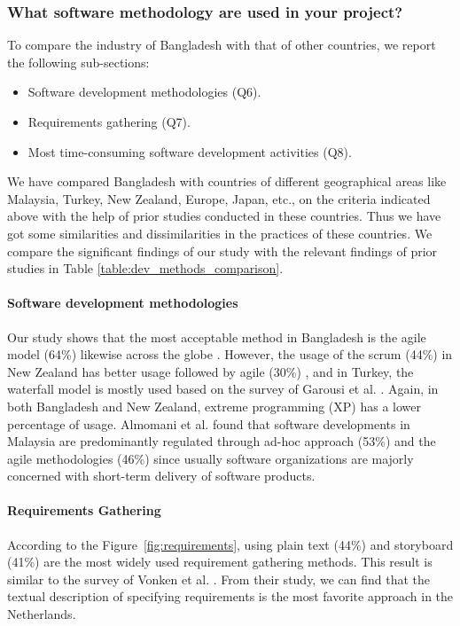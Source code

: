 \subsubsection{What software methodology are used in your project?}

To compare the industry of Bangladesh with that of other countries, we report the following sub-sections:

\begin{itemize}
\item Software development methodologies (Q6).
\item Requirements gathering (Q7).
\item Most time-consuming software development activities (Q8).
\end{itemize}



We have compared Bangladesh with countries of different geographical areas like Malaysia, Turkey, New Zealand, Europe, Japan, etc., on the criteria indicated above with the help of prior studies conducted in these countries. Thus we have got some similarities and dissimilarities in the practices of these countries. We compare the significant findings of our study with the relevant findings of prior studies in Table \ref{table:dev_methods_comparison}.


\paragraph{Software development methodologies}
Our study shows that the most acceptable method in Bangladesh is the agile model (64\%) likewise across the globe \citep{StackoverflowSurvey2018}. However, the usage of the scrum (44\%) in New Zealand has better usage followed by agile (30\%) \citep{Wang2018}, and in Turkey, the waterfall model is mostly used based on the survey of Garousi et al. \citep{Garousi2015}. Again, in both Bangladesh and New Zealand, extreme programming (XP) has a lower percentage of usage. Almomani et al. \citep{Almomani2015} found that software developments in Malaysia are predominantly regulated through ad-hoc approach (53\%) and the agile methodologies (46\%) since usually software organizations are majorly concerned with short-term delivery of software products.


\paragraph{Requirements Gathering}
According to the Figure~\ref{fig:requirements}, using plain text (44\%) and storyboard (41\%) are the most widely used requirement gathering methods. This result is similar to the survey of Vonken et al. \citep{Vonken2012}. From their study, we can find that the textual description of specifying requirements is the most favorite approach in the Netherlands.


